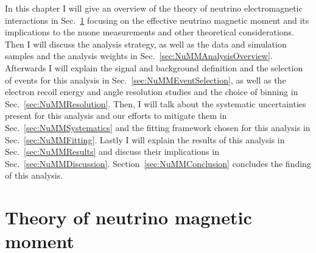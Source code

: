 


In this chapter I will give an overview of the theory of neutrino electromagnetic interactions in Sec.~\ref{sec:NuMMTheory} focusing on the effective neutrino magnetic moment and its implications to the \gls{nuone} measurements and other theoretical considerations. Then I will discuss the analysis strategy, as well as the data and simulation samples and the analysis weights in Sec.~\ref{sec:NuMMAnalysisOverview}. Afterwards I will explain the signal and background definition and the selection of events for this analysis in Sec.~\ref{sec:NuMMEventSelection}, as well as the electron recoil energy and angle resolution studies and the choice of binning in Sec.~\ref{sec:NuMMResolution}. Then, I will talk about the systematic uncertainties present for this analysis and our efforts to mitigate them in Sec.~\ref{sec:NuMMSystematics} and the fitting framework chosen for this analysis in Sec.~\ref{sec:NuMMFitting}. Lastly I will explain the results of this analysis in Sec.~\ref{sec:NuMMResults} and discuss their implications in Sec.~\ref{sec:NuMMDiscussion}. Section~\ref{sec:NuMMConclusion} concludes the finding of this analysis.




\section{Theory of neutrino magnetic moment}\label{sec:NuMMTheory}


